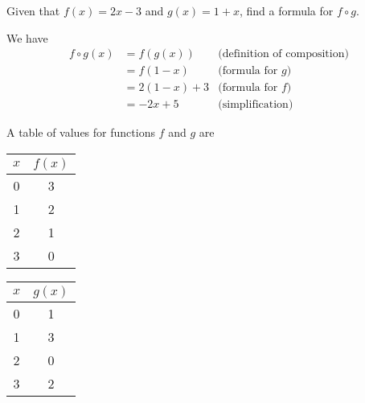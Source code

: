 \documentclass[12pt,fleqn]{exam}
\begin{document}
\begin{questions}


\question [2] Given that $f(x) = 2 x - 3$ and $g(x) = 1+x$, find 
a formula for $f \circ g$.

\begin{solution} We have
  \begin{align*}
     f \circ g (x) &= f(g(x)) & \mbox{(definition of composition)} \\
                   &= f(1-x)   & \mbox{(formula for $g$)} \\
                   &= 2 (1-x) + 3 & \mbox{(formula for $f$)} \\
                   &= -2x + 5 & \mbox{(simplification)} 
  \end{align*}

\end{solution}

\question A table of values for functions $f$ and $g$ are

\begin{tabular}[h]{|c|c|} 
  \hline
  $x$  & $f(x)$ \\ \hline \hline
  0    & 3 \\ \hline
  1    & 2 \\ \hline
  2    & 1 \\ \hline
  3    & 0 \\ \hline
\end{tabular} \phantom{xxxxxxx}
\begin{tabular}[h]{|c|c|} 
  \hline
  $x$  & $g(x)$ \\ \hline \hline
  0    & 1 \\ \hline
  1    & 3 \\ \hline
  2    & 0 \\ \hline
  3    & 2 \\ \hline
\end{tabular} 


\end{questions}
\end{document}
